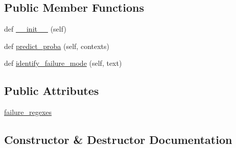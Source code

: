 \subsection*{Public Member Functions}
\begin{DoxyCompactItemize}
\item 
def \hyperlink{classprojects_1_1self__feeding_1_1feedback__classifier_1_1feedback__classifier_1_1FeedbackClassifierRegex_a9a8a64c3044529f2418ad7c0dff40bb3}{\+\_\+\+\_\+init\+\_\+\+\_\+} (self)
\item 
def \hyperlink{classprojects_1_1self__feeding_1_1feedback__classifier_1_1feedback__classifier_1_1FeedbackClassifierRegex_a31bd7f9578428ad2cf1921c4fbf51ba8}{predict\+\_\+proba} (self, contexts)
\item 
def \hyperlink{classprojects_1_1self__feeding_1_1feedback__classifier_1_1feedback__classifier_1_1FeedbackClassifierRegex_a24119cead515b84ee7308a53f821e681}{identify\+\_\+failure\+\_\+mode} (self, text)
\end{DoxyCompactItemize}
\subsection*{Public Attributes}
\begin{DoxyCompactItemize}
\item 
\hyperlink{classprojects_1_1self__feeding_1_1feedback__classifier_1_1feedback__classifier_1_1FeedbackClassifierRegex_a425d14474da43ffb0a75150fa04b26bc}{failure\+\_\+regexes}
\end{DoxyCompactItemize}


\subsection{Constructor \& Destructor Documentation}
\mbox{\label{classprojects_1_1self__feeding_1_1feedback__classifier_1_1feedback__classifier_1_1FeedbackClassifierRegex_a9a8a64c3044529f2418ad7c0dff40bb3}} 
